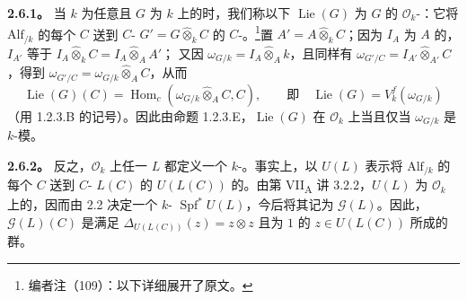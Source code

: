 \textbf{2.6.1。} 当 $k$ 为任意且 $G$ 为 $k$ 上的时，我们称以下 $\operatorname{Lie}(G)$ 为 $G$ 的 $\mathscr O_k$-：它将 $\mathrm{Alf}_{/k}$ 的每个 $C$ 送到 $C$- $G'=G\widehat\otimes_k C$ 的 $C$-。\footnote{编者注（109）：以下详细展开了原文。}置 $A'=A\widehat\otimes_k C$；因为 $I_A$ 为 $A$ 的，$I_{A'}$ 等于 $I_A\widehat\otimes_k C=I_A\widehat\otimes_A A'$；
又因 $\omega_{G/k}=I_A\widehat\otimes_A k$，且同样有 $\omega_{G'/C}=I_{A'}\widehat\otimes_{A'}C$，得到 $\omega_{G'/C}=\omega_{G/k}\widehat\otimes_A C$，从而
\[
\operatorname{Lie}(G)(C)=\operatorname{Hom}_c(\omega_{G/k}\widehat\otimes_A C,C),
\qquad\text{即}\quad\operatorname{Lie}(G)=V_k^f(\omega_{G/k})
\]
（用 1.2.3.B 的记号）。因此由命题 1.2.3.E，$\operatorname{Lie}(G)$ 在 $\mathscr O_k$ 上当且仅当 $\omega_{G/k}$ 是 $k$-模。

\textbf{2.6.2。} 反之，$\mathscr O_k$ 上任一 $L$ 都定义一个 $k$-。事实上，以 $U(L)$ 表示将 $\mathrm{Alf}_{/k}$ 的每个 $C$ 送到 $C$- $L(C)$ 的 $U(L(C))$ 的。由第 VII\textsubscript{A} 讲 3.2.2，$U(L)$ 为 $\mathscr O_k$ 上的，因而由 2.2 决定一个 $k$- $\operatorname{Spf}^*U(L)$，今后将其记为 $\mathscr G(L)$。因此，$\mathscr G(L)(C)$ 是满足 $\Delta_{U(L(C))}(z)=z\otimes z$ 且为 $1$ 的 $z\in U(L(C))$ 所成的群。

